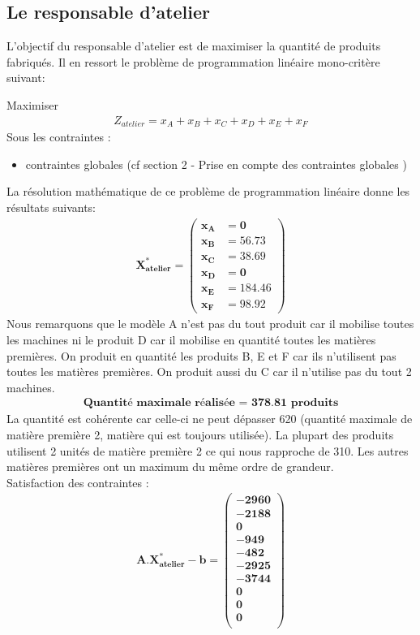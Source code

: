 \documentclass[12pt]{article}
\begin{document}
\subsection{Le responsable d'atelier}
L'objectif du responsable d'atelier est de maximiser la quantité de produits fabriqués. 
Il en ressort le problème de programmation linéaire mono-critère suivant:
\begin{tcolorbox}
Maximiser
\begin{align*}
Z_{atelier}= x_{A} + x_{B} + x_{C} + x_{D} + x_{E} + x_{F}
\end{align*}
Sous les contraintes :
\begin{itemize}
\item contraintes globales (cf section 2 - Prise en compte des contraintes globales )
\end{itemize}
\end{tcolorbox}
La résolution mathématique de ce problème de programmation linéaire donne les résultats suivants:
\begin{align*} 
	\boldsymbol{X^{*}_{atelier} = 
   \left (
   \begin{aligned}
       x_{A} &= 0 \\
      x_{B} &= 56.73 \\
      x_{C} &= 38.69 \\
      x_{D} &= 0 \\
      x_{E} &= 184.46 \\
      x_{F} &= 98.92 
   \end{aligned}
   \right )
 }
\end{align*}
Nous remarquons que le modèle A n'est pas du tout produit car il mobilise toutes les machines ni le produit D car il mobilise en quantité toutes les matières premières. On produit en quantité les produits B, E et F car ils n'utilisent pas toutes les matières premières. On produit aussi du C car il n'utilise pas du tout 2 machines.
\begin{align*}
\textbf{Quantité maximale réalisée = 378.81 produits}
\end{align*}
La quantité est cohérente car celle-ci ne peut dépasser 620 (quantité maximale de matière
première 2, matière qui est toujours utilisée). La plupart des produits utilisent 2 unités de 
matière première 2 ce qui nous rapproche de 310. Les autres matières premières ont un maximum du même ordre de grandeur.\\
Satisfaction des contraintes :
\begin{align*} 
	\boldsymbol{A.X^{*}_{atelier} - b = 
   \left (
   \begin{aligned}
      -2960 \\
      -2188 \\
      0 \\
      -949 \\
      -482\\
      -2925 \\
      -3744 \\
      0 \\
      0 \\
      0\\
   \end{aligned}
   \right )}
\end{align*}
\end{document}
